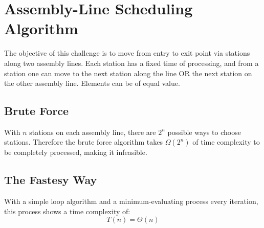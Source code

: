 \chapter{Assembly-Line Scheduling Algorithm}
The objective of this challenge is to move from entry to exit point via stations
along two assembly lines. Each station has a fixed time of processing, and from
a station one can move to the next station along the line OR the next station on
the other assembly line. Elements can be of equal value.

\section{Brute Force}
With $n$ stations on each assembly line, there are $2^n$ possible ways to choose
stations. Therefore the brute force algorithm takes $\Omega\left(2^n\right)$ of
time complexity to be completely processed, making it infeasible.

\section{The Fastesy Way}
With a simple loop algorithm and a minimum-evaluating process every iteration,
this process shows a time complexity of: \[ T(n)=\Theta(n) \]
